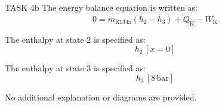 TASK 4b  
The energy balance equation is written as:  
\[
0 = \dot{m}_{\text{R134a}} \left( h_2 - h_3 \right) + \dot{Q}_{\text{K}} - W_{\text{K}}
\]  

The enthalpy at state 2 is specified as:  
\[
h_2 \, [x = 0]
\]  

The enthalpy at state 3 is specified as:  
\[
h_3 \, [8 \, \text{bar}]
\]  

No additional explanation or diagrams are provided.